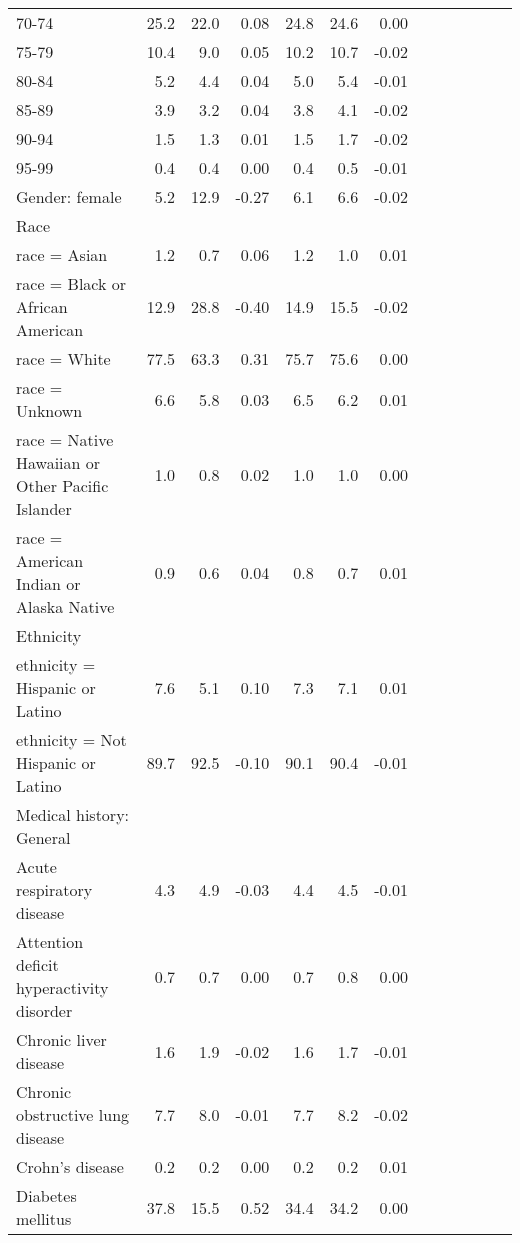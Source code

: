 \documentclass[11pt,]{article}
\begin{document}
\begin{longtable}{lrrrrrrrrrrrr}
      70-74 & 25.2 & 22.0 &  0.08 & 24.8 & 24.6 &  0.00 \\ 
      75-79 & 10.4 &  9.0 &  0.05 & 10.2 & 10.7 & -0.02 \\ 
      80-84 &  5.2 &  4.4 &  0.04 &  5.0 &  5.4 & -0.01 \\ 
      85-89 &  3.9 &  3.2 &  0.04 &  3.8 &  4.1 & -0.02 \\ 
      90-94 &  1.5 &  1.3 &  0.01 &  1.5 &  1.7 & -0.02 \\ 
      95-99 &  0.4 &  0.4 &  0.00 &  0.4 &  0.5 & -0.01 \\ 
  Gender: female &  5.2 & 12.9 & -0.27 &  6.1 &  6.6 & -0.02 \\ 
  Race &    &    &     &    &    &     \\ 
      race = Asian &  1.2 &  0.7 &  0.06 &  1.2 &  1.0 &  0.01 \\ 
      race = Black or African American & 12.9 & 28.8 & -0.40 & 14.9 & 15.5 & -0.02 \\ 
      race = White & 77.5 & 63.3 &  0.31 & 75.7 & 75.6 &  0.00 \\ 
      race = Unknown &  6.6 &  5.8 &  0.03 &  6.5 &  6.2 &  0.01 \\ 
      race = Native Hawaiian or Other Pacific Islander &  1.0 &  0.8 &  0.02 &  1.0 &  1.0 &  0.00 \\ 
      race = American Indian or Alaska Native &  0.9 &  0.6 &  0.04 &  0.8 &  0.7 &  0.01 \\ 
  Ethnicity &    &    &     &    &    &     \\ 
      ethnicity = Hispanic or Latino &  7.6 &  5.1 &  0.10 &  7.3 &  7.1 &  0.01 \\ 
      ethnicity = Not Hispanic or Latino & 89.7 & 92.5 & -0.10 & 90.1 & 90.4 & -0.01 \\ 
  Medical history: General &    &    &     &    &    &     \\ 
      Acute respiratory disease &  4.3 &  4.9 & -0.03 &  4.4 &  4.5 & -0.01 \\ 
      Attention deficit hyperactivity disorder &  0.7 &  0.7 &  0.00 &  0.7 &  0.8 &  0.00 \\ 
      Chronic liver disease &  1.6 &  1.9 & -0.02 &  1.6 &  1.7 & -0.01 \\ 
      Chronic obstructive lung disease &  7.7 &  8.0 & -0.01 &  7.7 &  8.2 & -0.02 \\ 
      Crohn's disease &  0.2 &  0.2 &  0.00 &  0.2 &  0.2 &  0.01 \\ 
      Diabetes mellitus & 37.8 & 15.5 &  0.52 & 34.4 & 34.2 &  0.00 \\ 

\end{longtable}
\end{document}
